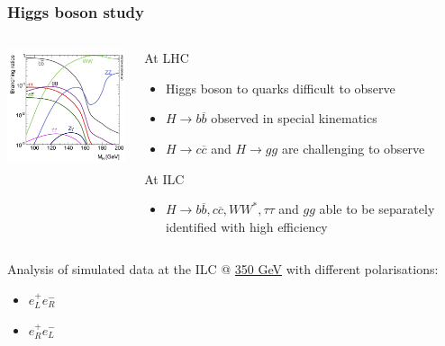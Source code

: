 \documentclass{beamer}
\begin{document}
    \begin{frame}
    \frametitle{Higgs boson study}

    \vspace{-0.3cm}
    \begin{columns}[c]
      \begin{column}{5cm}
        \begin{center}
          \includegraphics[width = 5cm]{Pictures/higgsbr.jpg}
        \end{center}
      \end{column}
      \begin{column}{5cm}
        \begin{block}{At LHC}
          \footnotesize
          \begin{itemize}
            \item Higgs boson to quarks difficult to observe
            \item $H \rightarrow b\overline{b}$ observed in special kinematics
            \item $H \rightarrow c\overline{c}$ and $H \rightarrow gg$ are challenging to observe
          \end{itemize}
        \end{block}
        \vspace{-0.3cm}
        \begin{block}{At ILC}
          \footnotesize
          \begin{itemize}
            \item $H \rightarrow b\overline{b}, c\overline{c}, WW^{*}, \tau\tau$ and $gg$ able to be separately identified with high efficiency 
          \end{itemize}
        \end{block}

      \end{column}
    \end{columns}

    \vspace{-0.1cm}
    \begin{center}
      Analysis of simulated data at the ILC @ \hyperlink{Xsec}{350 GeV} with different polarisations:
        \vspace{-0.2cm}
        \begin{itemize}
          \item $e^+_L e^-_R$
          \item $e^+_R e^-_L$
        \end{itemize}
    \end{center}

\end{frame}
\end{document}
